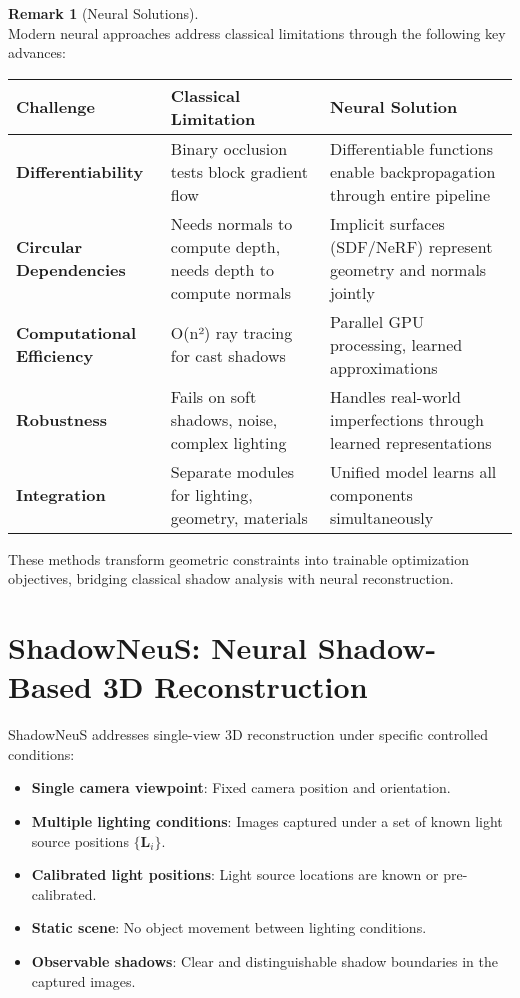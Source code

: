 \documentclass[12pt]{article}
\theoremstyle{definition}
\newtheorem{remark}{Remark}[subsection]
\begin{document}
\begin{remark}[Neural Solutions] \label{rmk:neural_solutions} ~\\
Modern neural approaches address classical limitations through the following key advances:

\begin{center}
\begin{tabular}{|l|p{5.5cm}|p{5.5cm}|}
\hline
\textbf{Challenge} & \textbf{Classical Limitation} & \textbf{Neural Solution} \\
\hline
\textbf{Differentiability} & Binary occlusion tests block gradient flow & Differentiable functions enable backpropagation through entire pipeline \\
\hline
\textbf{Circular Dependencies} & Needs normals to compute depth, needs depth to compute normals & Implicit surfaces (SDF/NeRF) represent geometry and normals jointly \\
\hline
\textbf{Computational Efficiency} & O(n²) ray tracing for cast shadows & Parallel GPU processing, learned approximations \\
\hline
\textbf{Robustness} & Fails on soft shadows, noise, complex lighting & Handles real-world imperfections through learned representations \\
\hline
\textbf{Integration} & Separate modules for lighting, geometry, materials & Unified model learns all components simultaneously \\
\hline
\end{tabular}
\end{center}

These methods transform geometric constraints into trainable optimization objectives, bridging classical shadow analysis with neural reconstruction.
\end{remark}

\section{ShadowNeuS: Neural Shadow-Based 3D Reconstruction} \label{sec:shadowneus}

ShadowNeuS addresses single-view 3D reconstruction under specific controlled conditions:

\begin{itemize}
    \item \textbf{Single camera viewpoint}: Fixed camera position and orientation.
    \item \textbf{Multiple lighting conditions}: Images captured under a set of known light source positions $\{\mathbf{L}_i\}$.
    \item \textbf{Calibrated light positions}: Light source locations are known or pre-calibrated.
    \item \textbf{Static scene}: No object movement between lighting conditions.
    \item \textbf{Observable shadows}: Clear and distinguishable shadow boundaries in the captured images.
\end{itemize}
\end{document}
